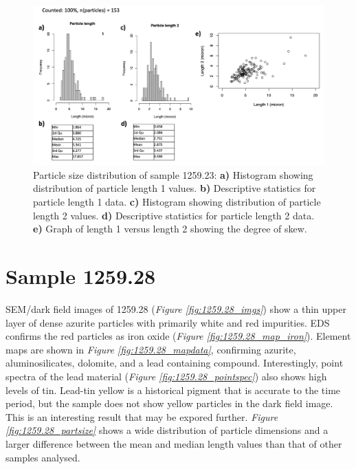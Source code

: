 \begin{figure}[H]
\centering
  \includegraphics[width=\linewidth]{1259-23_partsize}
\caption[Particle size distribution, sample 1259.23.]{Particle size distribution of sample 1259.23: \textbf{a)} Histogram showing distribution of particle length 1 values. \textbf{b)} Descriptive statistics for particle length 1 data. \textbf{c)} Histogram showing distribution of particle length 2 values. \textbf{d)} Descriptive statistics for particle length 2 data. \textbf{e)} Graph of length 1 versus length 2 showing the degree of skew.}
\label{fig:1259.23_partsize}
\end{figure}



\section{Sample 1259.28}

SEM/dark field images of 1259.28 (\textit{Figure \ref{fig:1259.28_imgs}}) show a thin upper layer of dense azurite particles with primarily white and red impurities. EDS confirms the red particles as iron oxide (\textit{Figure \ref{fig:1259.28_map_iron}}). Element maps are shown in \textit{Figure \ref{fig:1259.28_mapdata}}, confirming azurite, aluminosilicates, dolomite, and a lead containing compound. Interestingly, point spectra of the lead material (\textit{Figure \ref{fig:1259.28_pointspec}}) also shows high levels of tin. Lead-tin yellow is a historical pigment that is accurate to the time period, but the sample does not show yellow particles in the dark field image. This is an interesting result that may be expored further. \textit{Figure \ref{fig:1259.28_partsize}} shows a wide distribution of particle dimensions and a larger difference between the mean and median length values than that of other samples analysed.


